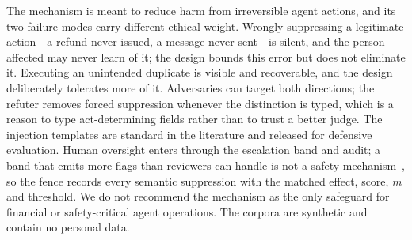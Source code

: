 The mechanism is meant to reduce harm from irreversible agent actions, and its two failure modes carry different ethical weight. Wrongly suppressing a legitimate action---a refund never issued, a message never sent---is silent, and the person affected may never learn of it; the design bounds this error but does not eliminate it. Executing an unintended duplicate is visible and recoverable, and the design deliberately tolerates more of it. Adversaries can target both directions; the refuter removes forced suppression whenever the distinction is typed, which is a reason to type act-determining fields rather than to trust a better judge. The injection templates are standard in the literature and released for defensive evaluation. Human oversight enters through the escalation band and audit; a band that emits more flags than reviewers can handle is not a safety mechanism~\cite{turan2026oversight}, so the fence records every semantic suppression with the matched effect, score, $m$ and threshold. We do not recommend the mechanism as the only safeguard for financial or safety-critical agent operations. The corpora are synthetic and contain no personal data.
